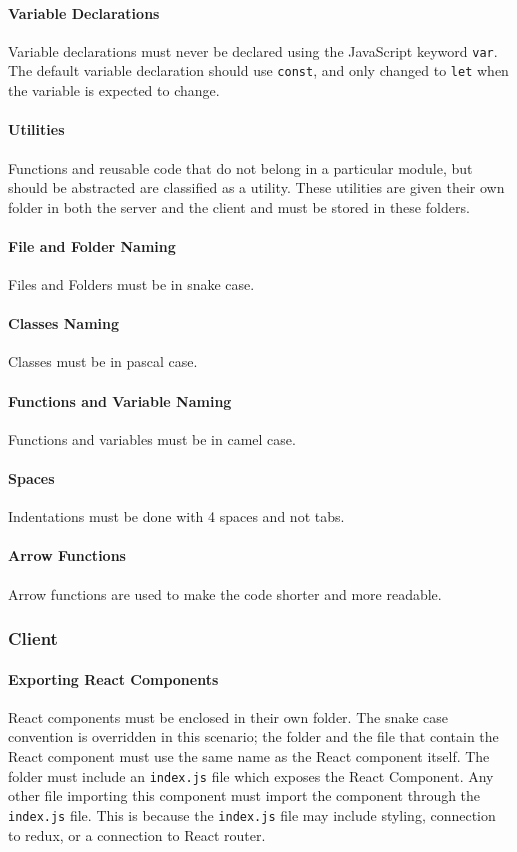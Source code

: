 \paragraph{Variable Declarations}
Variable declarations must never be declared using the JavaScript keyword \texttt{var}. The default variable declaration should use \texttt{const}, and only changed to \texttt{let} when the variable is expected to change.

\paragraph{Utilities}
Functions and reusable code that do not belong in a particular module, but should be abstracted are classified as a utility. These utilities are given their own folder in both the server and the client and must be stored in these folders.

\paragraph{File and Folder Naming}
Files and Folders must be in snake case. 

\paragraph{Classes Naming}
Classes must be in pascal case.

\paragraph{Functions and Variable Naming}
Functions and variables must be in camel case.

\paragraph{Spaces}
Indentations must be done with 4 spaces and not tabs.

\paragraph{Arrow Functions}
Arrow functions are used to make the code shorter and more readable.

\subsubsection{Client}

\paragraph{Exporting React Components}
React components must be enclosed in their own folder. The snake case convention is overridden in this scenario; the folder and the file that contain the React component must use the same name as the React component itself. The folder must include an \texttt{index.js} file which exposes the React Component. Any other file importing this component must import the component through the \texttt{index.js} file. This is because the \texttt{index.js} file may include styling, connection to redux, or a connection to React router.

